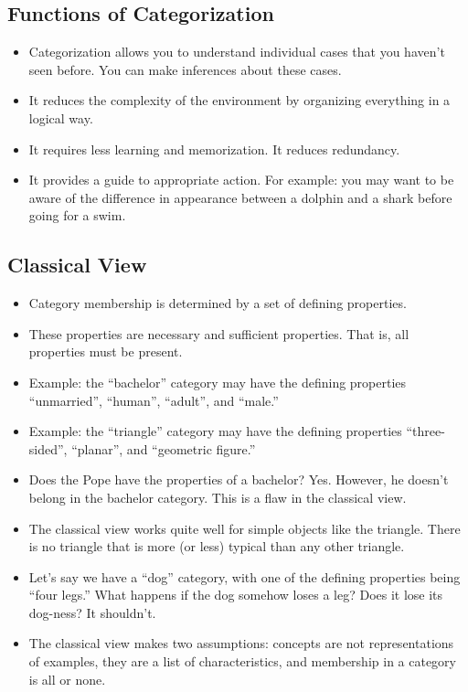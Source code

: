 \documentclass[]{article}
\begin{document}
		\subsection{Functions of Categorization}
			\begin{itemize}
				\item Categorization allows you to understand individual cases that you haven't seen before. You can make inferences about these cases.
				\item It reduces the complexity of the environment by organizing everything in a logical way.
				\item It requires less learning and memorization. It reduces redundancy.
				\item It provides a guide to appropriate action. For example: you may want to be aware of the difference in appearance between a dolphin and a shark before going for a swim.
			\end{itemize}

		\subsection{Classical View}
			\begin{itemize}
				\item Category membership is determined by a set of defining properties.
				\item These properties are necessary and sufficient properties. That is, all properties must be present.
				\item Example: the ``bachelor'' category may have the defining properties ``unmarried'', ``human'', ``adult'', and ``male.''
				\item Example: the ``triangle'' category may have the defining properties ``three-sided'', ``planar'', and ``geometric figure.''
				\item Does the Pope have the properties of a bachelor? Yes. However, he doesn't belong in the bachelor category. This is a flaw in the classical view.
				\item The classical view works quite well for simple objects like the triangle. There is no triangle that is more (or less) typical than any other triangle.
				\item Let's say we have a ``dog'' category, with one of the defining properties being ``four legs.'' What happens if the dog somehow loses a leg? Does it lose its dog-ness? It shouldn't.
				\item The classical view makes two assumptions: concepts are not representations of examples, they are a list of characteristics, and membership in a category is all or none.
			\end{itemize}
\end{document}
